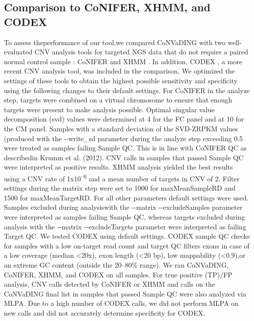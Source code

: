 \subsection{Comparison to CoNIFER, XHMM, and CODEX}
To assess theperformance of our tool,we compared CoNVaDING with two well-evaluated CNV analysis tools for targeted NGS data that do not require a paired normal control sample \cite{Guo_2013,Magi_2013,Backenroth_2014,Tan_2014}: CoNIFER \cite{Krumm_2012} and XHMM \cite{Fromer_2012}. 
In addition, CODEX \cite{Jiang_2015}, a more recent CNV analysis tool, was included in the comparison. 
We optimized the settings of these tools to obtain the highest possible sensitivity and specificity using the following changes to their default settings. 
For CoNIFER in the analyze step, targets were combined on a virtual chromosome to ensure that enough targets were present to make analysis possible. Optimal singular value decomposition (svd) values were determined at 4 for the FC panel and at 10 for the CM panel. 
Samples with a standard deviation of the SVD-ZRPKM values (produced with the {-}{-}write\_sd parameter during the analyze step \cite{Krumm_2012b} exceeding 0.5 were treated as samples failing Sample QC.
This is in line with CoNIFER QC as describedin Krumm et al. (2012)\cite{Krumm_2012}. 
CNV calls in samples that passed Sample QC were interpreted as positive results. 
XHMM analysis yielded the best results using a CNV rate of 1x10\textsuperscript{–6} and a mean number of targets in CNV of 2. 
Filter settings during the matrix step \cite{Fromer_2012b} were set to 1000 for maxMeanSampleRD and 1500 for maxMeanTargetRD. 
For all other parameters default settings were used. 
Samples excluded during analysiswith the {-}{-}matrix {-}{-}excludeSamples parameter \cite{Fromer_2012b} were interpreted as samples failing Sample QC, whereas targets excluded during analysis with the {-}{-}matrix {-}{-}excludeTargets parameter \cite{Fromer_2012b} were interpreted as failing Target QC. 
We tested CODEX using default settings. 
CODEX sample QC checks for samples with a low on-target read count and target QC filters exons in case of a low coverage (median \textless20x), exon length (\textless20 bp), low mappability (\textless0.9),or an extreme GC content (outside the 20–80\% range). 
We ran CoNVaDING, CoNIFER, XHMM, and CODEX on all samples. For true positive (TP)/FP analysis, CNV calls detected by CoNIFER or XHMM and calls on the CoNVaDING final list in samples that passed Sample QC were also analyzed via MLPA. 
Due to a high number of CODEX calls, we did not perform MLPA on new calls and did not accurately determine specificity for CODEX. 
